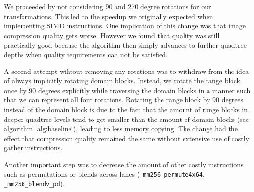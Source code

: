 We proceeded by not considering 90 and 270 degree rotations for our transformations.
This led to the speedup we originally expected when implementing SIMD instructions.
One implication of this change was that image compression quality gets worse. However we found that quality
was still practically good because the algorithm then simply advances to further quadtree
depths when quality requirements can not be satisfied.

A second attempt wihtout removing any rotations was to withdraw from the idea of always implicitly rotating domain blocks.
Instead, we rotate the range block once by 90 degrees explicitly while traversing the domain blocks
in a manner such that we can represent all four rotations.
Rotating the range block by 90 degrees instead of the domain block is due to the fact that the amount of range blocks
in deeper quadtree levels tend to get smaller than the amount of domain blocks (see algorithm \ref{alg:baseline}),
leading to less memory copying.
The change had the effect that compression quality remained the same without extensive use of costly
gather instructions.



Another important step was to decrease the amount of other costly instructions
such as permutations or blends across lanes (\verb|_mm256_permute4x64|,
\verb|_mm256_blendv_pd|).
